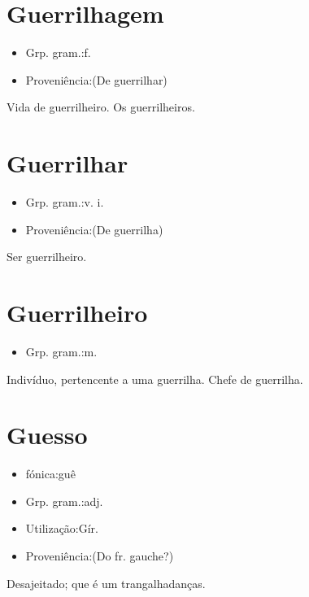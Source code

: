 \section{Guerrilhagem}
\begin{itemize}
\item {Grp. gram.:f.}
\end{itemize}
\begin{itemize}
\item {Proveniência:(De \textunderscore guerrilhar\textunderscore )}
\end{itemize}
Vida de guerrilheiro.
Os guerrilheiros.
\section{Guerrilhar}
\begin{itemize}
\item {Grp. gram.:v. i.}
\end{itemize}
\begin{itemize}
\item {Proveniência:(De \textunderscore guerrilha\textunderscore )}
\end{itemize}
Ser guerrilheiro.
\section{Guerrilheiro}
\begin{itemize}
\item {Grp. gram.:m.}
\end{itemize}
Indivíduo, pertencente a uma guerrilha.
Chefe de guerrilha.
\section{Guesso}
\begin{itemize}
\item {fónica:guê}
\end{itemize}
\begin{itemize}
\item {Grp. gram.:adj.}
\end{itemize}
\begin{itemize}
\item {Utilização:Gír.}
\end{itemize}
\begin{itemize}
\item {Proveniência:(Do fr. \textunderscore gauche\textunderscore ?)}
\end{itemize}
Desajeitado; que é um trangalhadanças.
